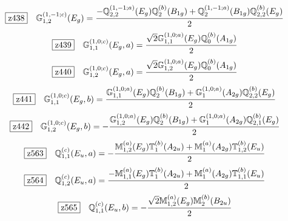 \documentclass[fleqn,10pt,landscape]{jsarticle}
\begin{document}
\begin{dmath*}
\hspace*{3mm}\fbox{z438}\quad \mathbb{G}_{1,2}^{(1,-1;c)}(E_{g})=\frac{- \mathbb{Q}_{2,2}^{(1,-1;a)}(E_{g}) \mathbb{Q}_{2}^{(b)}(B_{1g}) + \mathbb{Q}_{2}^{(1,-1;a)}(B_{1g}) \mathbb{Q}_{2,2}^{(b)}(E_{g})}{2}
\end{dmath*}
\begin{dmath*}
\hspace*{3mm}\fbox{z439}\quad \mathbb{G}_{1,1}^{(1,0;c)}(E_{g},a)=\frac{\sqrt{2} \mathbb{G}_{1,1}^{(1,0;a)}(E_{g}) \mathbb{Q}_{0}^{(b)}(A_{1g})}{2}
\end{dmath*}
\begin{dmath*}
\hspace*{3mm}\fbox{z440}\quad \mathbb{G}_{1,2}^{(1,0;c)}(E_{g},a)=\frac{\sqrt{2} \mathbb{G}_{1,2}^{(1,0;a)}(E_{g}) \mathbb{Q}_{0}^{(b)}(A_{1g})}{2}
\end{dmath*}
\begin{dmath*}
\hspace*{3mm}\fbox{z441}\quad \mathbb{G}_{1,1}^{(1,0;c)}(E_{g},b)=\frac{\mathbb{G}_{1,1}^{(1,0;a)}(E_{g}) \mathbb{Q}_{2}^{(b)}(B_{1g}) + \mathbb{G}_{1}^{(1,0;a)}(A_{2g}) \mathbb{Q}_{2,2}^{(b)}(E_{g})}{2}
\end{dmath*}
\begin{dmath*}
\hspace*{3mm}\fbox{z442}\quad \mathbb{G}_{1,2}^{(1,0;c)}(E_{g},b)=- \frac{\mathbb{G}_{1,2}^{(1,0;a)}(E_{g}) \mathbb{Q}_{2}^{(b)}(B_{1g}) + \mathbb{G}_{1}^{(1,0;a)}(A_{2g}) \mathbb{Q}_{2,1}^{(b)}(E_{g})}{2}
\end{dmath*}
\begin{dmath*}
\hspace*{3mm}\fbox{z563}\quad \mathbb{Q}_{1,1}^{(c)}(E_{u},a)=- \frac{\mathbb{M}_{1,2}^{(a)}(E_{g}) \mathbb{T}_{1}^{(b)}(A_{2u}) + \mathbb{M}_{1}^{(a)}(A_{2g}) \mathbb{T}_{1,2}^{(b)}(E_{u})}{2}
\end{dmath*}
\begin{dmath*}
\hspace*{3mm}\fbox{z564}\quad \mathbb{Q}_{1,2}^{(c)}(E_{u},a)=\frac{- \mathbb{M}_{1,1}^{(a)}(E_{g}) \mathbb{T}_{1}^{(b)}(A_{2u}) + \mathbb{M}_{1}^{(a)}(A_{2g}) \mathbb{T}_{1,1}^{(b)}(E_{u})}{2}
\end{dmath*}
\begin{dmath*}
\hspace*{3mm}\fbox{z565}\quad \mathbb{Q}_{1,1}^{(c)}(E_{u},b)=- \frac{\sqrt{2} \mathbb{M}_{1,2}^{(a)}(E_{g}) \mathbb{M}_{2}^{(b)}(B_{2u})}{2}
\end{dmath*}
\end{document}
